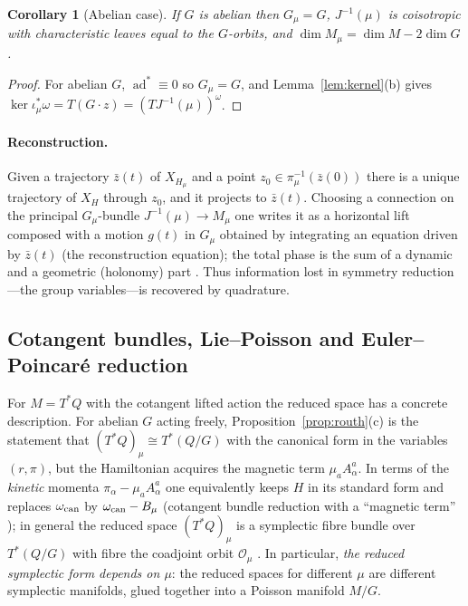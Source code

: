 \documentclass[11pt,a4paper]{article}
\numberwithin{equation}{section}
\theoremstyle{plain}
\newtheorem{corollary}[theorem]{Corollary}
\theoremstyle{definition}
\theoremstyle{remark}
\newcommand{\ad}{\operatorname{ad}}
\begin{document}
\begin{corollary}[Abelian case]\label{cor:abelian}
If $G$ is abelian then $G_\mu=G$, $J^{-1}(\mu)$ is coisotropic with characteristic leaves equal to the $G$-orbits, and $\dim M_\mu=\dim M-2\dim G$.
\end{corollary}
\begin{proof}
For abelian $G$, $\ad^*\equiv0$ so $G_\mu=G$, and Lemma~\ref{lem:kernel}(b) gives $\ker\iota_\mu^*\omega=T(G\cdot z)=(TJ^{-1}(\mu))^\omega$.
\end{proof}

\paragraph{Reconstruction.} Given a trajectory $\bar z(t)$ of $X_{H_\mu}$ and a point $z_0\in\pi_\mu^{-1}(\bar z(0))$ there is a unique trajectory of $X_H$ through $z_0$, and it projects to $\bar z(t)$. Choosing a connection on the principal $G_\mu$-bundle $J^{-1}(\mu)\to M_\mu$ one writes it as a horizontal lift composed with a motion $g(t)$ in $G_\mu$ obtained by integrating an equation driven by $\bar z(t)$ (the reconstruction equation); the total phase is the sum of a dynamic and a geometric (holonomy) part \cite{mmr1990,montgomery1991}. Thus information lost in symmetry reduction---the group variables---is recovered by quadrature.

\subsection{Cotangent bundles, Lie--Poisson and Euler--Poincar\'e reduction}\label{sec:cotred}

For $M=T^*Q$ with the cotangent lifted action the reduced space has a concrete description. For abelian $G$ acting freely, Proposition~\ref{prop:routh}(c) is the statement that $(T^*Q)_\mu\cong T^*(Q/G)$ with the canonical form in the variables $(r,\pi)$, but the Hamiltonian acquires the magnetic term $\mu_aA^a_\alpha$. In terms of the \emph{kinetic} momenta $\pi_\alpha-\mu_aA^a_\alpha$ one equivalently keeps $H$ in its standard form and replaces $\omega_{\rm can}$ by $\omega_{\rm can}-B_\mu$ (cotangent bundle reduction with a ``magnetic term'' \cite{smale1970,satzer1977,kummer1981,marsden1992}); in general the reduced space $(T^*Q)_\mu$ is a symplectic fibre bundle over $T^*(Q/G)$ with fibre the coadjoint orbit $\mathcal O_\mu$ \cite{mr1999,marsdenperlmutter2000}. In particular, \emph{the reduced symplectic form depends on $\mu$}: the reduced spaces for different $\mu$ are different symplectic manifolds, glued together into a Poisson manifold $M/G$.
\end{document}
